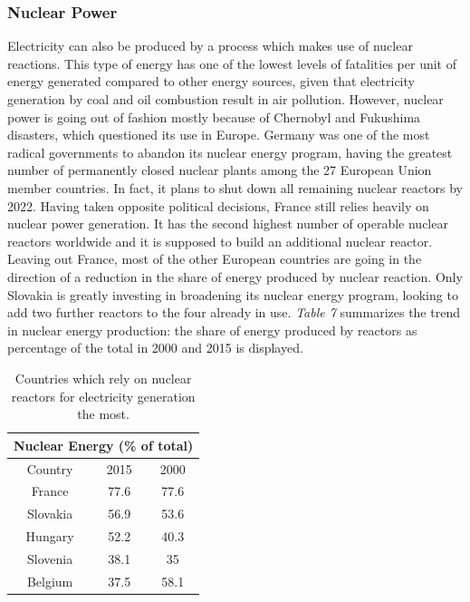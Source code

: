 \documentclass{book}
\begin{document}
\subsubsection*{Nuclear Power}

Electricity can also be produced by a process which makes use of nuclear reactions. This type of energy has one of the lowest levels of fatalities per unit of energy generated compared to other energy sources, given that electricity generation by coal and oil combustion result in air pollution. \cite{markandya2007electricity} However, nuclear power is going out of fashion mostly because of Chernobyl and Fukushima disasters, which questioned its use in Europe. Germany was one of the most radical governments to abandon its nuclear energy program, having the greatest number of permanently closed nuclear plants among the 27 European Union member countries. In fact, it plans to shut down all remaining nuclear reactors by 2022. Having taken opposite political decisions, France still relies heavily on nuclear power generation. It has the second highest number of operable nuclear reactors worldwide and it is supposed to build an additional nuclear reactor. Leaving out France, most of the other European countries are going in the direction of a reduction in the share of energy produced by nuclear reaction. Only Slovakia is greatly investing in broadening its nuclear energy program, looking to add two further reactors to the four already in use. \textit{Table 7} summarizes the trend in nuclear energy production: the share of energy produced by reactors as percentage of the total in 2000 and 2015 is displayed.

\bigskip
\begin{table}[H]
\begin{center}
\begin{tabular}{|c|c|c|}
\hline
\multicolumn{3}{|c|}{Nuclear Energy (\% of total)}\\
\hline
Country & 2015 & 2000 \\
\hline
France & 77.6 & 77.6 \\
Slovakia & 56.9 & 53.6 \\
Hungary & 52.2 & 40.3 \\
Slovenia & 38.1 & 35 \\
Belgium & 37.5 & 58.1\\
\hline
\end{tabular}
\caption{Countries which rely on nuclear reactors for electricity generation the most.}
\end{center}
\end{table}
\end{document}

